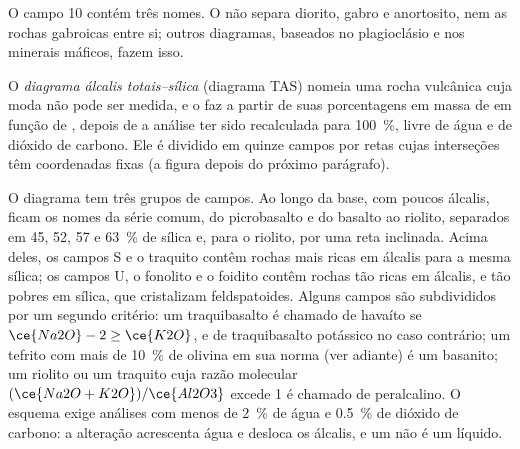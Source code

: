 \begin{omfigure}
\par{}
\end{omfigure}

O campo 10 contém três nomes. O  não separa diorito, gabro e
anortosito, nem as rochas gabroicas entre si; outros diagramas, baseados no
plagioclásio e nos minerais máficos, fazem isso.

\begin{definition}\label{def:b2:magmatic-series:tas}
O \emph{diagrama álcalis totais--sílica} (diagrama
TAS) nomeia uma rocha vulcânica cuja moda não pode ser medida, e o faz a partir de suas porcentagens
em massa de  em função de , depois de a análise ter sido
recalculada para \qty{100}{\percent}, livre de água e de dióxido de carbono. Ele é dividido
em quinze campos por retas cujas interseções têm coordenadas fixas
(a figura depois do próximo parágrafo).
\end{definition}

O diagrama tem três grupos de campos. Ao longo da base, com poucos álcalis, ficam os
nomes da série comum, do picrobasalto e do basalto ao riolito, separados em 45, 52,
57 e \qty{63}{\percent} de sílica e, para o riolito, por uma reta inclinada. Acima deles, os campos S e o traquito contêm rochas mais ricas em
álcalis para a mesma sílica; os campos U, o fonolito e o foidito contêm rochas tão ricas em
álcalis, e tão pobres em sílica, que cristalizam feldspatoides. Alguns campos são
subdivididos por um segundo critério: um traquibasalto é chamado de havaíto se $\ce{Na2O} - 2
\ge \ce{K2O}$, e de traquibasalto potássico no caso contrário; um tefrito com mais de
\qty{10}{\percent} de olivina em sua norma (ver adiante) é um basanito; um riolito ou um traquito cuja
razão molecular $(\ce{Na2O + K2O})/\ce{Al2O3}$ excede 1 é chamado de peralcalino. O esquema
exige análises com menos de \qty{2}{\percent} de água e \qty{0.5}{\percent} de
dióxido de carbono: a alteração acrescenta água e desloca os álcalis, e um  não é um
líquido.


